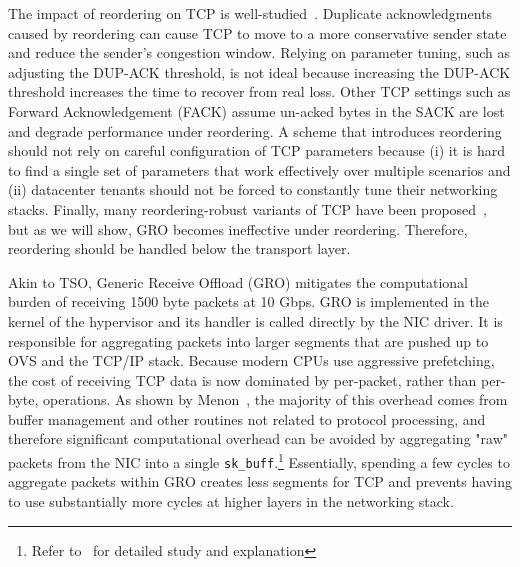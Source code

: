  The impact of reordering on TCP is well-studied~\cite{leung2007overview,paxson1997end}. 
Duplicate acknowledgments caused by reordering
can cause TCP to move to a more conservative sender state and reduce the sender's congestion window.
Relying on parameter tuning, such as adjusting the DUP-ACK threshold, is not ideal because 
increasing the DUP-ACK threshold increases the time to recover from real loss. Other TCP settings
such as Forward Acknowledgement (FACK) assume un-acked bytes in the SACK are lost and degrade
performance under reordering. 
A scheme that introduces reordering should not rely on careful configuration of TCP parameters
because (i) it is hard to find a single set of parameters that work effectively over multiple 
scenarios and (ii) datacenter tenants should not be forced to constantly tune their networking stacks.
Finally, many reordering-robust variants of TCP have been proposed~\cite{rr-tcp,blanton2002making,tcp-pr}, but
as we will show, GRO becomes ineffective under reordering. Therefore, reordering should
be handled below the transport layer.

Akin to TSO, Generic Receive Offload (GRO) mitigates the computational burden of receiving
1500 byte packets at 10 Gbps. GRO is implemented in the kernel of the hypervisor
and its handler is called directly by the NIC driver. It is responsible
for aggregating packets into larger segments that are pushed up to OVS and the TCP/IP stack.
Because modern CPUs use aggressive prefetching, the cost of receiving
TCP data is now dominated by per-packet, rather than per-byte, operations.
As shown by Menon~\cite{optimize-tcp-receive},  the majority of this overhead comes from
buffer management and other routines not related to protocol processing, and therefore 
significant computational overhead can be avoided by aggregating "raw" packets from
the NIC into a single {\tt sk\_buff}.\footnote{Refer to~\cite{optimize-tcp-receive} for detailed study and explanation}
Essentially, spending a few cycles to aggregate packets within GRO creates less segments for
TCP and prevents having to use substantially more cycles at higher layers in the networking stack.

